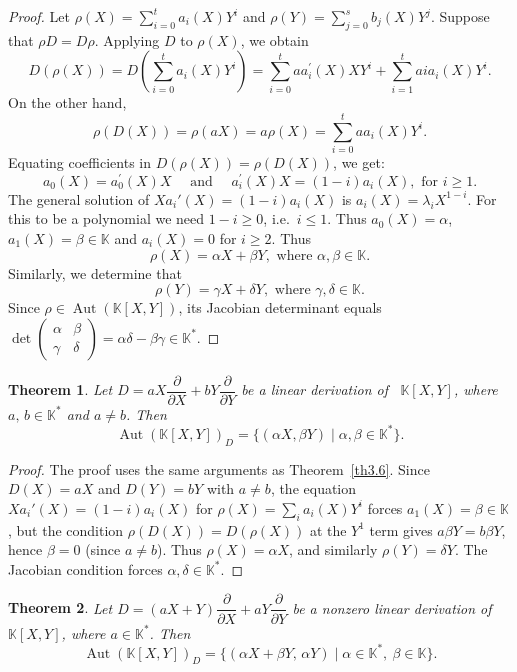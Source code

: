 \documentclass[11pt,a4paper,reqno]{amsart}
\newtheorem{theorem}{Theorem}[section]
\newcommand{\Aut}[0]{\ensuremath{\operatorname{Aut}}}
\begin{document}
\begin{proof}
Let $\rho(X)=\displaystyle\sum^t_{i=0}a_i(X) Y^i$ and $\rho(Y)=\displaystyle\sum^{s}_{j=0}b_j(X)Y^j$. Suppose that $\rho D=D\rho$. Applying $D$ to $\rho(X)$, we obtain
\[
D(\rho(X)) = D\left( \sum_{i=0}^t a_i(X) Y^i \right) = \sum_{i=0}^t  aa_i^{'}(X)XY^i + \sum_{i=1}^t a i a_i(X)Y^{i}.
\]
On the other hand,
\[
\rho(D(X)) = \rho(aX) = a \rho(X) = \sum_{i=0}^t aa_i(X) Y^i.
\]
Equating coefficients in $D(\rho(X)) = \rho(D(X))$, we get:
\[
a_0(X)=a_0^{\prime}(X)X  \quad \mbox{ and } \quad a_i^{\prime}(X)X = (1 - i) a_i(X), \mbox{ for } i\geq 1.
\]
The general solution of $Xa_i'(X)=(1-i)a_i(X)$ is $a_i(X) = \lambda_i X^{1-i}$. For this to be a polynomial we need $1-i \geq 0$, i.e.\ $i \leq 1$. Thus $a_0(X)=\alpha$, $a_1(X)=\beta \in \mathbb{K}$ and $a_i(X) =0$ for $i\geq 2$. Thus
\[
\rho(X)=\alpha X + \beta Y, \mbox{ where } \alpha, \beta \in \mathbb{K}.
\]
Similarly, we determine that
\[
\rho(Y)=\gamma X + \delta Y, \mbox{ where } \gamma, \delta \in \mathbb{K}.
\]
Since $\rho\in\Aut(\mathbb{K}[X,Y])$, its Jacobian determinant equals
$\det\begin{pmatrix}\alpha & \beta\\ \gamma & \delta\end{pmatrix}
=\alpha\delta-\beta\gamma\in\mathbb{K}^{\ast}$.
\end{proof}


\begin{theorem} \label{th3.7}
\label{tlinear}
		Let $D = aX \dfrac{\partial}{\partial X} + bY \dfrac{\partial}{\partial Y}$ be a linear derivation of \, $\mathbb{K}[X,Y]$, where   $a,\, b\in \mathbb{K}^*$ and $a \neq b$. Then 
    \[
      \operatorname{Aut}(\mathbb{K}[X,Y])_D=\{(\alpha X,\beta Y) \mid \alpha,\beta\in \mathbb{K}^{\ast}\}.
    \]
\end{theorem}

\begin{proof}
The proof uses the same arguments as Theorem~\ref{th3.6}. Since $D(X)=aX$ and $D(Y)=bY$ with $a\neq b$, the equation $Xa_i'(X)=(1-i)a_i(X)$ for $\rho(X)=\sum_i a_i(X)Y^i$ forces $a_1(X)=\beta\in\mathbb{K}$, but the condition $\rho(D(X))=D(\rho(X))$ at the $Y^1$ term gives $a\beta Y = b\beta Y$, hence $\beta=0$ (since $a\neq b$). Thus $\rho(X)=\alpha X$, and similarly $\rho(Y)=\delta Y$. The Jacobian condition forces $\alpha,\delta\in\mathbb{K}^*$.
\end{proof}

\begin{theorem} \label{th3.8}
		Let $D=(aX +Y)\dfrac{\partial}{\partial X}+aY\dfrac{\partial}{\partial Y}$ be a nonzero linear derivation of $\mathbb{K}[X,Y]$, where   $a \in \mathbb{K}^*$. Then 
        \[
        \operatorname{Aut}(\mathbb{K}[X,Y])_D= \{(\alpha X +\beta Y,\,\alpha Y ) \mid \alpha \in \mathbb{K}^*,\ \beta \in \mathbb{K}\}.
        \]
\end{theorem}
\end{document}
